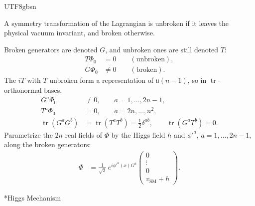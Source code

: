 \documentclass[11pt,a4paper,oneside]{report}
\makeatletter
\newcommand\topic{\@startsection{paragraph}{4}{\z@}{-1.7ex plus -.3ex}{.5ex}{\normalfont\normalsize\bfseries\itshape\boldmath}*}
\makeatother
\begin{document}
\begin{CJK*}{UTF8}{gbsn}
\begin{itemize}
A symmetry transformation of the Lagrangian is unbroken if it leaves the physical vacuum invariant, and broken otherwise.

Broken generators are denoted $G$, and unbroken ones are still denoted $T$:
\begin{equation*}
{\displaystyle 
\begin{aligned}
T\Phi_0&=0\qquad(\text{unbroken}),\\
G\Phi_0&\neq0\qquad(\text{broken}).
\end{aligned}
}
\tag{5.34}\label{eq:5.34}
\end{equation*}
The $iT$ with $T$ unbroken form a representation of $\mathfrak u(n-1)$, so in $\operatorname{tr}$-orthonormal bases,
\begin{equation*}
\begin{aligned}
G^a\Phi_0&\neq0,\qquad a=1,\ldots,2n-1,\\
T^a\Phi_0&=0,\qquad a=2n,\ldots,n^2,\\
\operatorname{tr}(G^aG^b)&=\operatorname{tr}(T^aT^b)=\frac12\delta^{ab},\qquad\operatorname{tr}(G^aT^b)=0 .
\end{aligned}
\tag{5.35}\label{eq:5.35}
\end{equation*}
Parametrize the $2n$ real fields of $\Phi$ by the Higgs field $h$ and $\phi'^a$, $a=1,\ldots,2n-1$, along the broken generators:
\begin{equation*}
{\displaystyle 
\begin{aligned}
\Phi&=\frac1{\sqrt2}\,e^{i\phi'^a(x)G^a}\begin{pmatrix}0\\\vdots\\0\\v_{\mathrm{SM}}+h\end{pmatrix} .
\end{aligned}
}
\tag{5.36}\label{eq:5.36}
\end{equation*}
\end{itemize}


\label{higgs-mechanism-masses}%
\topic{Higgs Mechanism}


\end{CJK*}
\end{document}
